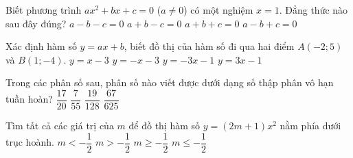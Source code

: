 \begin{ex}%
	Biết phương trình $ax^2 + bx + c = 0$ ($a \neq 0$) có một nghiệm  $x = 1$. Đẳng thức nào sau đây đúng?
	\choice
	{$a - b - c = 0$ }
	{$a + b - c = 0$ }
	{\True $a + b + c = 0$ }
	{$a - b + c = 0$ }
\end{ex}



\begin{ex}%
	Xác định hàm số $y = ax + b$, biết đồ thị của hàm số đi qua hai điểm $A(-2; 5)$ và $B(1; -4)$.
	\choice
	{$y = x - 3$ }
	{$y = -x - 3$ }
	{\True $y = -3x - 1$ }
	{$y = 3x - 1$ }
\end{ex}



\begin{ex}%
	Trong các phân số sau, phân số nào viết được dưới dạng số thập phân vô hạn tuần hoàn?
	\choice
	{$\dfrac{17}{20}$ }
	{\True $\dfrac{7}{55}$ }
	{$\dfrac{19}{128}$ }
	{$\dfrac{67}{625}$ }
\end{ex}



\begin{ex}%
	Tìm tất cả các giá trị của $m$ để đồ thị hàm số $y = (2m + 1)x^2$ nằm phía dưới trục hoành.
	\choice
	{\True $m < -\dfrac{1}{2}$ }
	{$m > -\dfrac{1}{2}$ }
	{$m \geq -\dfrac{1}{2}$ }
	{$m \leq -\dfrac{1}{2}$ }
\end{ex}



